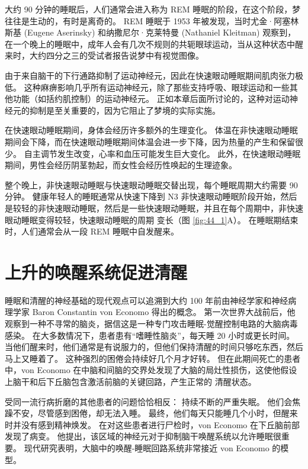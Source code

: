 大约 90 分钟的睡眠后，人们通常会进入称为 REM 睡眠的阶段，在这个阶段，梦往往是生动的，有时是离奇的。
REM 睡眠于 1953 年被发现，当时尤金·阿塞林斯基 (Eugene Aserinsky) 和纳撒尼尔·克莱特曼 (Nathaniel Kleitman) 观察到，在一个晚上的睡眠中，成年人会有几次不规则的共轭眼球运动，当从这种状态中醒来时，大约四分之三的受试者报告说梦中有视觉图像。


由于来自脑干的下行通路抑制了运动神经元，因此在快速眼动睡眠期间肌肉张力极低。
这种麻痹影响几乎所有运动神经元，除了那些支持呼吸、眼球运动和一些其他功能（如括约肌控制）的运动神经元。
正如本章后面所讨论的，这种对运动神经元的抑制是至关重要的，因为它阻止了梦境的实际实施。


在快速眼动睡眠期间，身体会经历许多额外的生理变化。
体温在非快速眼动睡眠期间会下降，而在快速眼动睡眠期间体温会进一步下降，因为热量的产生和保留很少。
自主调节发生改变，心率和血压可能发生巨大变化。
此外，在快速眼动睡眠期间，男性会经历阴茎勃起，而女性会经历性唤起的生理迹象。


整个晚上，非快速眼动睡眠与快速眼动睡眠交替出现，每个睡眠周期大约需要 90 分钟。
健康年轻人的睡眠通常从快速下降到 N3 非快速眼动睡眠阶段开始，然后是较轻的非快速眼动睡眠，然后是一些快速眼动睡眠，并且在每个周期中，非快速眼动睡眠变得较轻，快速眼动睡眠的周期 变长（图 \ref{fig:44_1}A）。
在睡眠期结束时，人们通常会从一段 REM 睡眠中自发醒来。



\section{上升的唤醒系统促进清醒}

睡眠和清醒的神经基础的现代观点可以追溯到大约 100 年前由神经学家和神经病理学家 Baron Constantin von Economo 得出的概念。
第一次世界大战前后，他观察到一种不寻常的脑炎，据信这是一种专门攻击睡眠-觉醒控制电路的大脑病毒感染。
在大多数情况下，患者患有“嗜睡性脑炎”，每天睡 20 小时或更长时间。
当他们醒来时，他们通常是有说服力的，但他们保持清醒的时间只够吃东西，然后马上又睡着了。
这种强烈的困倦会持续好几个月才好转。
但在此期间死亡的患者中，von Economo 在中脑和间脑的交界处发现了大脑的局灶性损伤，这使他假设上脑干和后下丘脑包含激活前脑的关键回路，产生正常的 清醒状态。


受同一流行病折磨的其他患者的问题恰恰相反：
持续不断的严重失眠。
他们会焦躁不安，尽管感到困倦，却无法入睡。
最终，他们每天只能睡几个小时，但醒来时并没有感到精神焕发。
在对这些患者进行尸检时，von Economo 在下丘脑前部发现了病变。
他提出，该区域的神经元对于抑制脑干唤醒系统以允许睡眠很重要。
现代研究表明，大脑中的唤醒-睡眠回路系统非常接近 von Economo 的模型。



